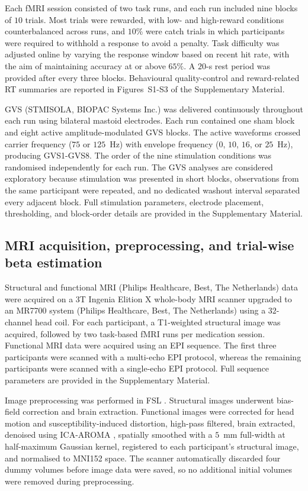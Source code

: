 \documentclass[utf8]{FrontiersinHarvard}
\begin{document}
Each fMRI session consisted of two task runs, and each run included nine blocks of \(10\) trials. Most trials were rewarded, with low- and high-reward conditions counterbalanced across runs, and \(10\%\) were catch trials in which participants were required to withhold a response to avoid a penalty. Task difficulty was adjusted online by varying the response window based on recent hit rate, with the aim of maintaining accuracy at or above \(65\%\). A \(20\)-s rest period was provided after every three blocks. Behavioural quality-control and reward-related RT summaries are reported in Figures~S1-S3 of the Supplementary Material.

GVS (STMISOLA, BIOPAC Systems Inc.) was delivered continuously throughout each run using bilateral mastoid electrodes. Each run contained one sham block and eight active amplitude-modulated GVS blocks. The active waveforms crossed carrier frequency (\(75\) or \(125\)~Hz) with envelope frequency (\(0\), \(10\), \(16\), or \(25\)~Hz), producing GVS1-GVS8. The order of the nine stimulation conditions was randomised independently for each run. The GVS analyses are considered exploratory because stimulation was presented in short blocks, observations from the same participant were repeated, and no dedicated washout interval separated every adjacent block. Full stimulation parameters, electrode placement, thresholding, and block-order details are provided in the Supplementary Material.

\subsection{MRI acquisition, preprocessing, and trial-wise beta estimation}
Structural and functional MRI (Philips Healthcare, Best, The Netherlands) data were acquired on a \(3\)T Ingenia Elition X whole-body MRI scanner upgraded to an MR7700 system (Philips Healthcare, Best, The Netherlands) using a \(32\)-channel head coil. For each participant, a T1-weighted structural image was acquired, followed by two task-based fMRI runs per medication session. Functional MRI data were acquired using an EPI sequence. The first three participants were scanned with a multi-echo EPI protocol, whereas the remaining participants were scanned with a single-echo EPI protocol. Full sequence parameters are provided in the Supplementary Material.

Image preprocessing was performed in FSL \citep{smith2004advances}. Structural images underwent bias-field correction and brain extraction. Functional images were corrected for head motion and susceptibility-induced distortion, high-pass filtered, brain extracted, denoised using ICA-AROMA \citep{pruim2015ica}, spatially smoothed with a \(5\)~mm full-width at half-maximum Gaussian kernel, registered to each participant's structural image, and normalised to MNI152 space. The scanner automatically discarded four dummy volumes before image data were saved, so no additional initial volumes were removed during preprocessing.
\end{document}
